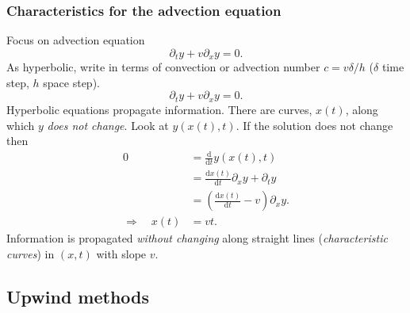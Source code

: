 \documentclass{beamer}
\newcommand{\oda}[2]{\frac{\text{d}{#1}}{\text{d}{#2}}}
\begin{document}
\begin{frame}
  \frametitle{Characteristics for the advection equation}
  \begin{overlayarea}{\textwidth}{0.9\textheight}
    {
      Focus on advection equation
      \begin{equation*}
        \partial_t y + v \partial_x y = 0.
      \end{equation*}
      As hyperbolic,
      write in terms of convection or advection number $c = v
      \delta / h$  ($\delta$  time step, $h$ space step).
    }
    {
      \begin{equation*}
        \partial_t y + v \partial_x y = 0.
      \end{equation*}
      Hyperbolic equations propagate
      information.   There are curves,
      $x(t)$, along which $y$ \emph{does not change}.
    }
    {
      Look at $y\left( x(t), t \right)$.
    }
    {
      If the solution does not change then
      \begin{align*}
         0 & = \oda{}{t} y\left( x(t), t \right) \\
           & = \oda{x(t)}{t} \partial_x y + \partial_t y \\
           & = \left( \oda{x(t)}{t} - v \right) \partial_x y. \\
        \Rightarrow \quad x(t) & = v t.
      \end{align*}
    }
    {
      Information is propagated \emph{without
        changing} along straight lines (\emph{characteristic curves})
      in $(x, t)$ with slope $v$.
    }
  \end{overlayarea}

\end{frame}


\subsection{Upwind methods}
\end{document}
